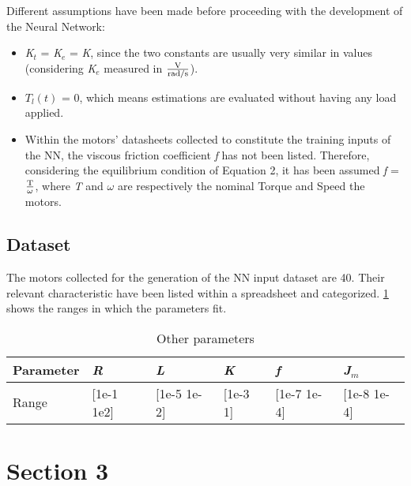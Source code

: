 Different assumptions have been made before proceeding with the development of the Neural Network:

\begin{itemize}
 \item \textit{K$_{t}$} = \textit{K$_{e}$} = \textit{K}, since the two constants are usually very similar in values (considering \textit{K$_{e}$} measured in $\frac{\text{V}}{\text{rad/s}} $).
 \item \textit{$T_l(t)$} = 0, which means estimations are evaluated without having any load applied.
 \item Within the motors' datasheets collected to constitute the training inputs of the NN, the viscous friction coefficient \textit{f} has not been listed. Therefore, considering the equilibrium condition of Equation 2, it has been assumed \textit{f} = $\frac{\text{T}}{\text{$\omega$}}$, where \textit{T} and $\omega$ are respectively the nominal Torque and Speed the motors.
\end{itemize}


\subsection{Dataset}

The motors collected for the generation of the NN input dataset are 40. Their relevant characteristic have been listed within a spreadsheet and categorized.
\ref{table:ranges} shows the ranges in which the parameters fit.

\begin{table}[h!] %
\centering	
\renewcommand{\arraystretch}{1.5}  
\begin{tabular}{| l || l l l l l |} 
 \hline
 Parameter & \textit{R} & \textit{L} & \textit{K} & \textit{f} & \textit{J$_{m}$}\\ [0.5ex]  
 \hline
 Range & [1e-1 1e2] & [1e-5 1e-2] & [1e-3 1] & [1e-7 1e-4] & [1e-8 1e-4]\\
 \hline
\end{tabular}
\caption{Other parameters}
\label{table:ranges}
\end{table}
\newpage

\section{\textbf{Section 3}}

